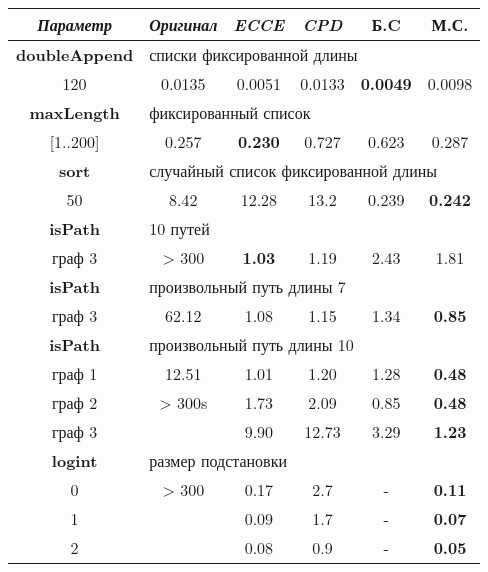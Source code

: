 \begin{table}[h!]
\center
\begin{tabular}{|c|c|c|c|c|c|}
\hline
{\it Параметр} & {\it Оригинал} & {\it ECCE }  & {\it CPD} & {\bf Б.C} & {\bf М.С.} \\ \hline
{\bf doubleAppend} & \multicolumn{5}{|l|}{списки фиксированной длины } \\ \hline
120                & 0.0135 & 0.0051 & 0.0133 & {\bf 0.0049} & 0.0098 \\ \hline


{\bf maxLength} & \multicolumn{5}{|l|}{фиксированный список} \\ \hline

       [1..200] & 0.257 & {\bf 0.230} & 0.727 & 0.623 & 0.287 \\ \hline


{\bf sort} & \multicolumn{5}{|l|}{случайный список фиксированной длины } \\ \hline
50       & 8.42     & 12.28 & 13.2 & 0.239  & {\bf 0.242} \\ \hline

 {\bf isPath} & \multicolumn{5}{|l|}{10 путей} \\ \hline
  граф 3      & > 300 & {\bf 1.03} & 1.19 & 2.43 & 1.81 \\ \hline

 {\bf isPath} & \multicolumn{5}{|l|}{произвольный путь длины 7} \\ \hline
   граф 3     & 62.12 & 1.08 & 1.15 & 1.34 & {\bf 0.85} \\ \hline
 {\bf isPath} & \multicolumn{5}{|l|}{произвольный путь длины 10} \\ \hline
 граф 1  &  12.51  & 1.01 & 1.20 &  1.28 & {\bf 0.48} \\
 граф 2  &  > 300s & 1.73 & 2.09 & 0.85 & {\bf 0.48} \\
 граф 3  &         & 9.90 & 12.73& 3.29 & {\bf 1.23} \\
 \hline

{\bf logint} & \multicolumn{5}{|l|}{размер подстановки} \\ \hline
0 & > 300    & 0.17  & 2.7  & -  &  {\bf 0.11} \\
1 &          & 0.09  & 1.7  & -  &  {\bf 0.07} \\
2 &          & 0.08   & 0.9  & -  & {\bf 0.05} \\
\hline


\end{tabular}
\end{table}
